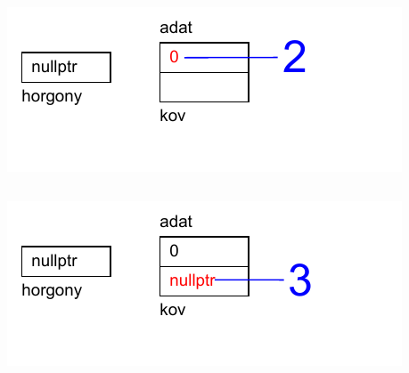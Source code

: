 \begin{frame}
  \begin{columns}[c]
      \begin{exampleblock}{}
        \vspace{-.2cm}
        \small
        
        \vspace{-.2cm}
      \end{exampleblock}
      \includegraphics[width=\textwidth]{verem/verem03.pdf}
  \end{columns}
\end{frame}

\begin{frame}
  \begin{columns}[c]
      \begin{exampleblock}{}
        \vspace{-.2cm}
        \small
        
        \vspace{-.2cm}
      \end{exampleblock}
      \includegraphics[width=\textwidth]{verem/verem04.pdf}
  \end{columns}
\end{frame}

